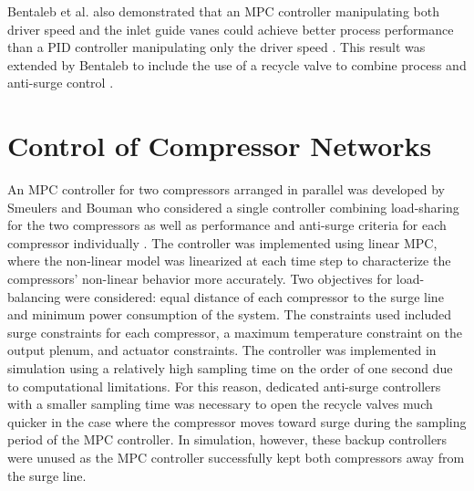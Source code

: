 Bentaleb et al. also demonstrated that an MPC controller manipulating both driver speed and the inlet guide vanes could achieve better process performance than a PID controller manipulating only the driver speed \cite{Bentaleb2014}.
This result was extended by Bentaleb to include the use of a recycle valve to combine process and anti-surge control \cite{Bentaleb2015}.


\section{Control of Compressor Networks}

An MPC controller for two compressors arranged in parallel was developed by Smeulers and Bouman who considered a single controller combining load-sharing for the two compressors as well as performance and anti-surge criteria for each compressor individually \cite{Smeulers1999}. 
The controller was implemented using linear MPC, where the non-linear model was linearized at each time step to characterize the compressors' non-linear behavior more accurately.
Two objectives for load-balancing were considered: equal distance of each compressor to the surge line and minimum power consumption of the system. 
The constraints used included surge constraints for each compressor, a maximum temperature constraint on the output plenum, and actuator constraints.
The controller was implemented in simulation using a relatively high sampling time on the order of one second due to computational limitations. 
For this reason, dedicated anti-surge controllers with a smaller sampling time was necessary to open the recycle valves much quicker in the case where the compressor moves toward surge during the sampling period of the MPC controller. 
In simulation, however, these backup controllers were unused as the MPC controller successfully kept both compressors away from the surge line.

